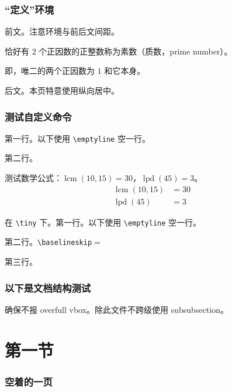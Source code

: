 \documentclass{../pkslide}
\newcommand{\lcm}{\operatorname{lcm}} %
\newcommand{\lpd}{\operatorname{lpd}} %
\begin{document}
\begin{frame}[c]
  \frametitle{“定义”环境}
  
  前文。注意环境与前后文间距。
  
  \begin{definition}[素数]
    恰好有 $2$ 个正因数的正整数称为{素数（质数，prime number）}。
    
    即，唯二的两个正因数为 $1$ 和它本身。
  \end{definition}
  
  后文。本页特意使用纵向居中。
\end{frame}

\begin{frame}[fragile]
  \frametitle{测试自定义命令}
  
  第一行。以下使用 \verb|\emptyline| 空一行。
  
  \emptyline
  
  第二行。
  
  测试数学公式：$\lcm(10, 15) = 30$，$\lpd(45) = 3$。
  \begin{align*}
    \lcm(10, 15) &= 30 \\
    \lpd(45) &= 3
  \end{align*}
  {\tiny
    在 \verb|\tiny| 下。第一行。以下使用 \verb|\emptyline| 空一行。
    
    \emptyline
    
    第二行。\verb|\baselineskip|${}={}$\the\baselineskip
    
    \vspace{0.6\baselineskip}
    
    第三行。
    
  } %
\end{frame}

\begin{frame}[c]
  \frametitle{以下是文档结构测试}
  
  确保不报 overfull vbox。除此文件不跨级使用 subsubsection。
  
  \begin{multicols}{2}
    \tableofcontents
  \end{multicols}
\end{frame}

\section{第一节}

\begin{frame}
  \frametitle{空着的一页}
\end{frame}
\end{document}
